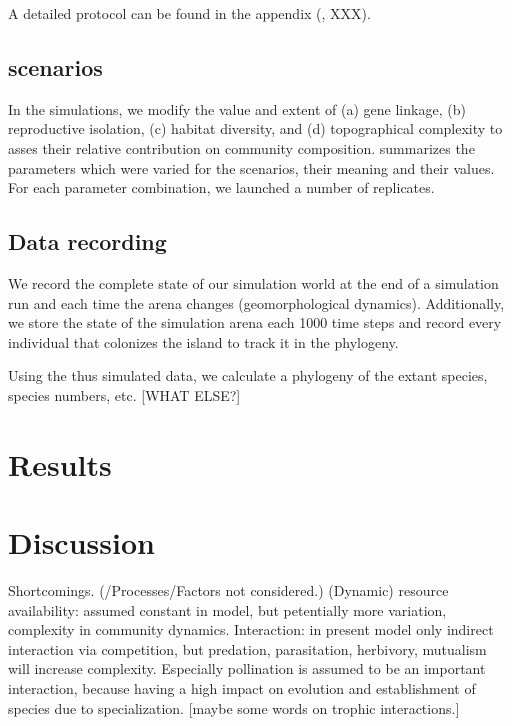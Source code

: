 \documentclass[a4paper]{scrartcl}
\begin{document}
A detailed protocol can be found in the appendix (\cite{grimm2010odd}, XXX).

\subsection{scenarios}
In the simulations, we modify the value and extent of
(a) gene linkage,
(b) reproductive isolation,
(c) habitat diversity, and
(d) topographical complexity
to asses their relative contribution on community composition.
 summarizes the parameters which were varied for the scenarios, their meaning and their values. %
For each parameter combination, we launched a number of %
replicates.

\subsection{Data recording}
We record the complete state of our simulation world at the end of a simulation run and each time the arena changes (geomorphological dynamics).
Additionally, we store the state of the simulation arena each 1000 %
time steps and record every individual that colonizes the island to track it in the phylogeny.

Using the thus simulated data, we calculate a phylogeny of the extant species, species numbers, etc. [WHAT ELSE?]
\section{Results}

\section{Discussion}
Shortcomings. (/Processes/Factors not considered.)
(Dynamic) resource availability: assumed constant in model, but petentially more variation, complexity in community dynamics.
Interaction: in present model only indirect interaction via competition, but predation, parasitation, herbivory, mutualism will increase complexity.
Especially pollination is assumed to be an important interaction, because having a high impact on evolution and establishment of species due to specialization.
[maybe some words on trophic interactions.]

\printbibliography
\end{document}
